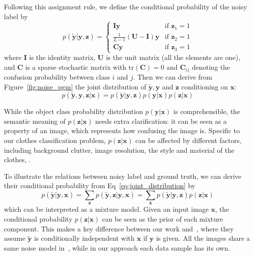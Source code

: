 \documentclass[10pt,twocolumn,letterpaper]{article}
\def\vec{\mathbf}
\def\mat{\mathbf}
\begin{document}
Following this assignment rule, we define the conditional probability of the noisy label by
\begin{equation} \label{eq:likelihood}
    p(\tilde{\vec{y}}|\vec{y},\vec{z}) = \begin{cases}
        \mat{I}\vec{y} & \text{if } \vec{z}_1 = 1 \\
        \frac{1}{L-1}(\mat{U} - \mat{I})\vec{y} & \text{if } \vec{z}_2 = 1 \\
        \mat{C}\vec{y} & \text{if } \vec{z}_3 = 1
    \end{cases}
\end{equation}
where $\mat{I}$ is the identity matrix, $\mat{U}$ is the unit matrix (all the elements are one), and $\mat{C}$ is a sparse stochastic matrix with $\mathrm{tr}(\mat{C})=0$ and $\mat{C}_{ij}$ denoting the confusion probability between class $i$ and $j$. Then we can derive from Figure~\ref{fig:noise_pgm} the joint distribution of $\tilde{\vec{y}}, \vec{y}$ and $\vec{z}$ conditioning on $\vec{x}$:
\begin{equation} \label{eq:joint_distribution}
  p(\tilde{\vec{y}}, \vec{y}, \vec{z} | \vec{x}) = p(\tilde{\vec{y}} | \vec{y}, \vec{z}) p(\vec{y} | \vec{x}) p(\vec{z} | \vec{x})
\end{equation}

While the object class probability distribution $p(\vec{y} | \vec{x})$ is comprehensible, the semantic meaning of $p(\vec{z} | \vec{x})$ needs extra clarification: it can be seen as a property of an image, which represents how confusing the image is. Specific to our clothes classification problem, $p(\vec{z} | \vec{x})$ can be affected by different factors, including background clutter, image resolution, the style and material of the clothes, \etc.

To illustrate the relations between noisy label and ground truth, we can derive their conditional probability from Eq~\ref{eq:joint_distribution} by
\begin{equation}
    p(\tilde{\vec{y}} | \vec{y}, \vec{x}) = \sum_{\vec{z}} p(\tilde{\vec{y}}, \vec{z} | \vec{y}, \vec{x}) = \sum_{\vec{z}} p(\tilde{\vec{y}} | \vec{y}, \vec{z}) p(\vec{z} | \vec{x})
\end{equation}
which can be interpreted as a mixture model. Given an input image $\vec{x}$, the conditional probability $p(\vec{z} | \vec{x})$ can be seen as the prior of each mixture component. This makes a key difference between our work and~\cite{sukhbaatar2014learning}, where they assume $\tilde{\vec{y}}$ is conditionally independent with $\vec{x}$ if $\vec{y}$ is given. All the images share a same noise model in~\cite{sukhbaatar2014learning}, while in our approach each data sample has its own.
\end{document}
